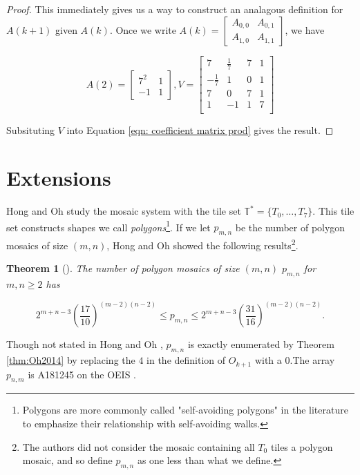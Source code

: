 \documentclass[12pt]{article}
\theoremstyle{plain}
\newtheorem{thm}{Theorem}[section]
\theoremstyle{definition}
\theoremstyle{remark}
\theoremstyle{definition}
\begin{document}
\begin{proof}
This immediately gives us a way to construct an analagous definition for $A(k+1)$ given $A(k)$. Once we write $A(k) = \begin{bmatrix} A_{0,0} & A_{0,1} \\ A_{1,0} & A_{1,1} \end{bmatrix}$, we have

$$
A(2) = 
\begin{bmatrix}
    7^2 & 1 \\
    -1 & 1
\end{bmatrix},
V = 
\begin{bmatrix}
    7 & \frac{1}{7} & 7 & 1 \\
    -\frac{1}{7} & 1 & 0 & 1 \\
    7 & 0 & 7  & 1 \\
    1 & -1 & 1 & 7 \\
\end{bmatrix}
$$

Subsituting $V$ into Equation \ref{eqn: coefficient matrix prod} gives the result.

\end{proof}


\section{Extensions}
\label{section: Extensions}

Hong and Oh \cite{Hong2018} study the mosaic system with the tile set $\mathbb{T}^* = \{T_0, \dots,T_7\}$. This tile set constructs shapes we call \textit{polygons}\footnote{Polygons are more commonly called "self-avoiding polygons" in the literature to emphasize their relationship with self-avoiding walks.}. If we let $p_{m,n}$ be the number of polygon mosaics of size $(m,n)$, Hong and Oh showed the following results\footnote{The authors did not consider the mosaic containing all $T_0$ tiles a polygon mosaic, and so define $p_{m,n}$ as one less than what we define.}. 

\begin{thm}[\cite{Hong2018}]
    \label{thm:Hong2018}
    The number of polygon mosaics of size $(m,n)$ $p_{m,n}$ for $m,n \geq 2$ has

    $$2^{m+n-3} \left(\frac{17}{10}\right)^{(m-2)(n-2)} \leq p_{m,n} \leq 2^{m+n-3} \left(\frac{31}{16}\right)^{(m-2)(n-2)}.$$
\end{thm}

Though not stated in Hong and Oh \cite{Hong2018}, $p_{m,n}$ is exactly enumerated by Theorem \ref{thm:Oh2014} by replacing the $4$ in the definition of $O_{k+1}$ with a $0$.The array $p_{n,m}$ is A181245 on the OEIS \cite[OEIS]{oeis}. 
\end{document}
